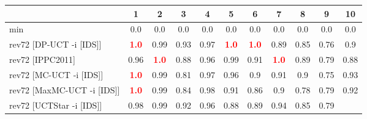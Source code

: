\documentclass{article}
\begin{document}
\begin{tabular}{|l|r@{$\pm$}rr@{$\pm$}rr@{$\pm$}rr@{$\pm$}rr@{$\pm$}rr@{$\pm$}rr@{$\pm$}rr@{$\pm$}rr@{$\pm$}rr@{$\pm$}r|}
\hline

& \multicolumn{2}{c}{1}
& \multicolumn{2}{c}{2}
& \multicolumn{2}{c}{3}
& \multicolumn{2}{c}{4}
& \multicolumn{2}{c}{5}
& \multicolumn{2}{c}{6}
& \multicolumn{2}{c}{7}
& \multicolumn{2}{c}{8}
& \multicolumn{2}{c}{9}
& \multicolumn{2}{c|}{10}
\\
\hline
\hline
min
& \multicolumn{2}{c}{0.0}
& \multicolumn{2}{c}{0.0}
& \multicolumn{2}{c}{0.0}
& \multicolumn{2}{c}{0.0}
& \multicolumn{2}{c}{0.0}
& \multicolumn{2}{c}{0.0}
& \multicolumn{2}{c}{0.0}
& \multicolumn{2}{c}{0.0}
& \multicolumn{2}{c}{0.0}
& \multicolumn{2}{c|}{0.0}
\\
rev72 [DP-UCT -i [IDS]]
& \multicolumn{2}{c}{\textbf{\textcolor{red}{1.0}}}
& \multicolumn{2}{c}{0.99}
& \multicolumn{2}{c}{0.93}
& \multicolumn{2}{c}{0.97}
& \multicolumn{2}{c}{\textbf{\textcolor{red}{1.0}}}
& \multicolumn{2}{c}{\textbf{\textcolor{red}{1.0}}}
& \multicolumn{2}{c}{0.89}
& \multicolumn{2}{c}{0.85}
& \multicolumn{2}{c}{0.76}
& \multicolumn{2}{c|}{0.9}
\\
rev72 [IPPC2011]
& \multicolumn{2}{c}{0.96}
& \multicolumn{2}{c}{\textbf{\textcolor{red}{1.0}}}
& \multicolumn{2}{c}{0.88}
& \multicolumn{2}{c}{0.96}
& \multicolumn{2}{c}{0.99}
& \multicolumn{2}{c}{0.91}
& \multicolumn{2}{c}{\textbf{\textcolor{red}{1.0}}}
& \multicolumn{2}{c}{0.89}
& \multicolumn{2}{c}{0.79}
& \multicolumn{2}{c|}{0.88}
\\
rev72 [MC-UCT -i [IDS]]
& \multicolumn{2}{c}{\textbf{\textcolor{red}{1.0}}}
& \multicolumn{2}{c}{0.99}
& \multicolumn{2}{c}{0.81}
& \multicolumn{2}{c}{0.97}
& \multicolumn{2}{c}{0.96}
& \multicolumn{2}{c}{0.9}
& \multicolumn{2}{c}{0.91}
& \multicolumn{2}{c}{0.9}
& \multicolumn{2}{c}{0.75}
& \multicolumn{2}{c|}{0.93}
\\
rev72 [MaxMC-UCT -i [IDS]]
& \multicolumn{2}{c}{\textbf{\textcolor{red}{1.0}}}
& \multicolumn{2}{c}{0.99}
& \multicolumn{2}{c}{0.84}
& \multicolumn{2}{c}{0.98}
& \multicolumn{2}{c}{0.91}
& \multicolumn{2}{c}{0.86}
& \multicolumn{2}{c}{0.9}
& \multicolumn{2}{c}{0.78}
& \multicolumn{2}{c}{0.79}
& \multicolumn{2}{c|}{0.92}
\\
rev72 [UCTStar -i [IDS]]
& \multicolumn{2}{c}{0.98}
& \multicolumn{2}{c}{0.99}
& \multicolumn{2}{c}{0.92}
& \multicolumn{2}{c}{0.96}
& \multicolumn{2}{c}{0.88}
& \multicolumn{2}{c}{0.89}
& \multicolumn{2}{c}{0.94}
& \multicolumn{2}{c}{0.85}
& \multicolumn{2}{c}{0.79}

\end{tabular}
\end{document}
